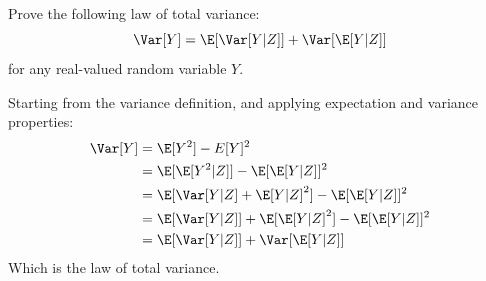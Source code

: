 \documentclass{article}
\begin{document}
\begin{homeworkProblem}

    Prove the following law of total variance:
    \[
        \Var[Y] = \E[\Var[Y|Z]] + \Var[\E[Y|Z]]
    \]
    for any real-valued random variable $Y$. \\

    \solution

    Starting from the variance definition, and applying expectation and variance properties:
    \begin{align*}
        \Var[Y] & = \E[Y^2] - E[Y]^2                              \\
                & = \E[\E[Y^2|Z]] - \E[\E[Y|Z]]^2                 \\
                & = \E[\Var[Y|Z] + \E[Y|Z]^2] - \E[\E[Y|Z]]^2     \\
                & = \E[\Var[Y|Z]] + \E[\E[Y|Z]^2] - \E[\E[Y|Z]]^2 \\
                & = \E[\Var[Y|Z]] + \Var[\E[Y|Z]]
    \end{align*}
    Which is the law of total variance.

\end{homeworkProblem}
\end{document}
